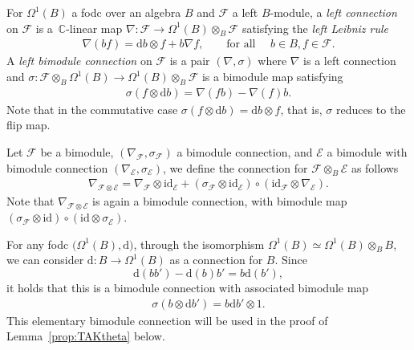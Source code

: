 \documentclass[10pt,a4paper]{amsart}
\numberwithin{equation}{section}
\begin{document}
For $\Omega^1(B)$ a fodc over an algebra $B$ and $\mathcal{F}$ a left $B$-module, a \emph{left connection} on $\mathcal{F}$ is a~$\mathbb{C}$-linear map $\nabla\colon \mathcal{F} \to \Omega^1(B)\otimes_B \mathcal{F}$ satisfying the \emph{left Leibniz rule}
\begin{gather*}
\nabla(bf) = \mathrm{d} b \otimes f + b \nabla f, \qquad \textrm{for all } \quad b \in B, f \in \mathcal{F}.
\end{gather*}
A \emph{left bimodule connection} on $\mathcal{F}$ is a pair $(\nabla,\sigma)$ where $\nabla$ is a left connection and $\sigma\colon \mathcal{F} \otimes_B \Omega^1(B) \rightarrow \Omega^1(B) \otimes_B \mathcal{F} $ is a bimodule map satisfying
\begin{gather}\label{eqn:BiC}
 \sigma (f\otimes \mathrm{d}b)= \nabla (fb)-\nabla(f)b.
\end{gather}
Note that in the commutative case $\sigma(f \otimes \mathrm{d} b) = \mathrm{d} b \otimes f$, that is, $\sigma$ reduces to the flip map.

Let $\mathcal{F}$ be a bimodule, $(\nabla_{\mathcal{F}}, \sigma_{\mathcal{F}})$ a bimodule connection, and $\mathcal{E}$ a bimodule with bimodule connection $(\nabla_\mathcal{E}, \sigma_{\mathcal{E}})$, we define the connection for $\mathcal{F} \otimes_B \mathcal{E}$ as follows
\begin{gather}\label{eqn:bimcontenpr}
 \nabla_{\mathcal{F}\otimes \mathcal{E}}= \nabla_{\mathcal{F}}\otimes \mathrm{id}_{\mathcal{E}}+(\sigma_{\mathcal{F}}\otimes \mathrm{\mathrm{id}}_\mathcal{E})\circ (\mathrm{id}_{\mathcal{F}}\otimes \nabla_{\mathcal{E}}).
\end{gather}
Note that $\nabla_{\mathcal{F} \otimes \mathcal{E}}$ is again a bimodule connection, with bimodule map $(\sigma_{\mathcal{F}} \otimes \mathrm{id}) \circ (\mathrm{id} \otimes \sigma_{\mathcal{E}})$.

\begin{eg} \label{eg:trivialBimodConn}
For any fodc $\big(\Omega^1(B),\mathrm{d}\big)$, through the isomorphism $\Omega^1(B) \simeq \Omega^1(B) \otimes_B B$, we can consider $\mathrm{d}\colon B \to \Omega^1(B)$ as a connection for $B$. Since
\[
\mathrm{d}(bb') - \mathrm{d}(b)b' = b\mathrm{d}(b'),
\]
it holds that this is a bimodule connection with associated bimodule map
\begin{gather*}
\sigma(b \otimes \mathrm{d} b') = b\mathrm{d} b' \otimes 1.
\end{gather*}
This elementary bimodule connection will be used in the proof of Lemma~\ref{prop:TAKtheta} below.
\end{eg}
\end{document}
